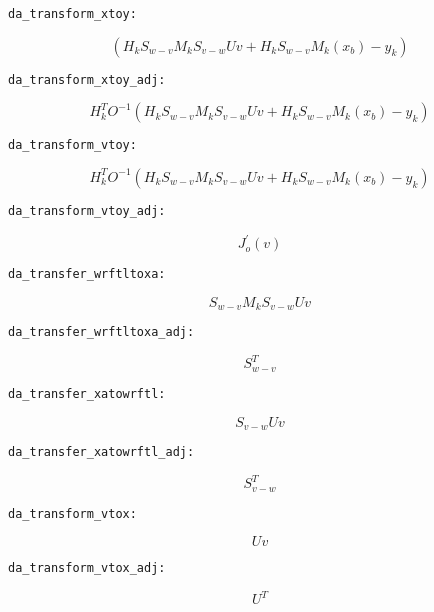 \documentclass[a4paper,12pt,titlepage]{article}
\begin{document}
\begin{verbatim}
da_transform_xtoy:
 \end{verbatim} 
\[
(H_kS_{w-v}M_kS_{v-w}Uv+H_kS_{w-v}M_k(x_b)-y_k)
\]

\begin{verbatim}
da_transform_xtoy_adj:
 \end{verbatim} 
\[
H_k^TO^{-1}(H_kS_{w-v}M_kS_{v-w}Uv+H_kS_{w-v}M_k(x_b)-y_k)
\]

\begin{verbatim}
da_transform_vtoy:
 \end{verbatim} 
\[
H_k^TO^{-1}(H_kS_{w-v}M_kS_{v-w}Uv+H_kS_{w-v}M_k(x_b)-y_k)
\]

\begin{verbatim}
da_transform_vtoy_adj:
 \end{verbatim} 
\[
J^{'}_o(v)
\] 

\begin{verbatim}
da_transfer_wrftltoxa:
\end{verbatim} 
\[
S_{w-v}M_kS_{v-w}Uv
\] 

\begin{verbatim}
da_transfer_wrftltoxa_adj:
\end{verbatim} 
\[
S^T_{w-v}
\] 

\begin{verbatim}
da_transfer_xatowrftl:
\end{verbatim} 
\[
S_{v-w}Uv
\] 

\begin{verbatim}
da_transfer_xatowrftl_adj:
\end{verbatim} 
\[
S^T_{v-w}
\] 

\begin{verbatim}
da_transform_vtox:
\end{verbatim} 
\[
Uv
\] 

\begin{verbatim}
da_transform_vtox_adj:
\end{verbatim} 
\[
U^T
\] 

 
\end{document}
